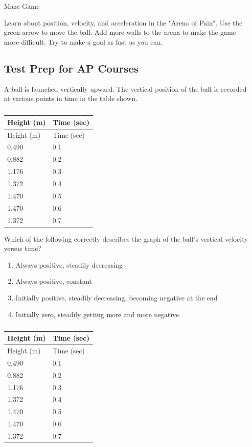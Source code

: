 \documentclass[
]{book}
\providecommand{\tightlist}{%
  \setlength{\itemsep}{0pt}\setlength{\parskip}{0pt}}
\newenvironment{ap-test-prep}{}{}
\newenvironment{note}{}{}
\begin{document}
\hypertarget{eip-718}{}
\begin{note}

Maze Game

Learn about position, velocity, and acceleration in the "Arena of
Pain". Use the green arrow to move the ball. Add more walls to the
arena to make the game more difficult. Try to make a goal as fast as you
can. {\hfill\break
}

\hypertarget{fs-id1167067104720}{}

\end{note}

\hypertarget{fs-id1636015}{}
\begin{ap-test-prep}

\hypertarget{test-prep-for-ap-courses-7}{%
\subsection{Test Prep for AP Courses}\label{test-prep-for-ap-courses-7}}

\hypertarget{fs-id1398128}{}
\leavevmode\hypertarget{fs-id1879989}{}%
A ball is launched vertically upward. The vertical position of the ball
is recorded at various points in time in the table shown.

\begin{longtable}[]{@{}ll@{}}
\caption{{}}\tabularnewline
\toprule
Height (m) & Time (sec)\tabularnewline
\midrule
\endfirsthead
\toprule
Height (m) & Time (sec)\tabularnewline
\midrule
\endhead
0.490 & 0.1\tabularnewline
0.882 & 0.2\tabularnewline
1.176 & 0.3\tabularnewline
1.372 & 0.4\tabularnewline
1.470 & 0.5\tabularnewline
1.470 & 0.6\tabularnewline
1.372 & 0.7\tabularnewline
\bottomrule
\end{longtable}

Which of the following correctly describes the graph of the ball's
vertical velocity versus time?

\begin{enumerate}
\def\labelenumi{\alph{enumi}.}
\tightlist
\item
  Always positive, steadily decreasing
\item
  Always positive, constant
\item
  Initially positive, steadily decreasing, becoming negative at the
  end
\item
  Initially zero, steadily getting more and more negative
\end{enumerate}

\hypertarget{fs-id2061889}{}
\hypertarget{fs-id1418139}{}
\begin{longtable}[]{@{}ll@{}}
\caption{{}}\tabularnewline
\toprule
Height (m) & Time (sec)\tabularnewline
\midrule
\endfirsthead
\toprule
Height (m) & Time (sec)\tabularnewline
\midrule
\endhead
0.490 & 0.1\tabularnewline
0.882 & 0.2\tabularnewline
1.176 & 0.3\tabularnewline
1.372 & 0.4\tabularnewline
1.470 & 0.5\tabularnewline
1.470 & 0.6\tabularnewline
1.372 & 0.7\tabularnewline
\bottomrule
\end{longtable}


\end{ap-test-prep}
\end{document}
